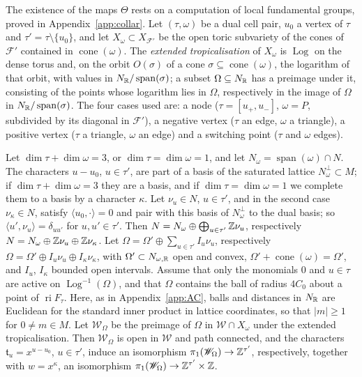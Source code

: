The existence of the maps $\Theta$ rests on a computation of local fundamental groups, proved in Appendix~\ref{app:collar}.
Let $(\tau,\omega)$ be a dual cell pair, $u_0$ a vertex of $\tau$ and $\tau'=\tau\setminus\{u_0\}$, and let
$X_\omega\subset X_{\mathcal F'}$ be the open toric subvariety of the cones of $\mathcal F'$ contained in
$\operatorname{cone}(\omega)$. The \emph{extended tropicalisation} of $X_\omega$ is $\operatorname{Log}$ on the dense torus and,
on the orbit $O(\sigma)$ of a cone $\sigma\subseteq\operatorname{cone}(\omega)$, the logarithm of that orbit, with values in
$N_\mathbb R/\operatorname{span}(\sigma)$; a subset $\Omega\subseteq N_\mathbb R$ has a preimage under it, consisting of the points whose
logarithm lies in $\Omega$, respectively in the image of $\Omega$ in $N_\mathbb R/\operatorname{span}(\sigma)$. The four cases used
are: a node ($\tau=[u_+,u_-]$, $\omega=P$, subdivided by its diagonal in $\mathcal F'$), a negative vertex ($\tau$ an edge,
$\omega$ a triangle), a positive vertex ($\tau$ a triangle, $\omega$ an edge) and a switching point ($\tau$ and $\omega$ edges).

\begin{lemma}\label{lem:pi1}
Let $\dim\tau+\dim\omega=3$, or $\dim\tau=\dim\omega=1$, and let $N_\omega=\operatorname{span}(\omega)\cap N$. The characters
$u-u_0$, $u\in\tau'$, are part of a basis of the saturated lattice $N_\omega^\perp\subset M$; if $\dim\tau+\dim\omega=3$ they
are a basis, and if $\dim\tau=\dim\omega=1$ we complete them to a basis by a character $\kappa$. Let $\nu_u\in N$, $u\in\tau'$,
and in the second case $\nu_\kappa\in N$, satisfy $\langle u_0,\cdot\rangle=0$ and pair with this basis of $N_\omega^\perp$ to
the dual basis; so $\langle u',\nu_u\rangle=\delta_{uu'}$ for $u,u'\in\tau'$. Then $N=N_\omega\oplus\bigoplus_{u\in\tau'}\mathbb Z\nu_u$,
respectively $N=N_\omega\oplus\mathbb Z\nu_u\oplus\mathbb Z\nu_\kappa$. Let $\Omega=\Omega'\oplus\sum_{u\in\tau'}I_u\nu_u$, respectively
$\Omega=\Omega'\oplus I_u\nu_u\oplus I_\kappa\nu_\kappa$, with $\Omega'\subset N_{\omega,\mathbb R}$ open and convex,
$\Omega'+\operatorname{cone}(\omega)=\Omega'$, and $I_u$, $I_\kappa$ bounded open intervals. Assume that only the monomials $0$
and $u\in\tau$ are active on $\operatorname{Log}^{-1}(\Omega)$, and that $\Omega$ contains the ball of radius $4C_0$ about a point
of $\operatorname{ri}F_\tau$. Here, as in Appendix~\ref{app:AC}, balls and distances in $N_\mathbb R$ are Euclidean for the standard
inner product in lattice coordinates, so that $|m|\ge1$ for $0\neq m\in M$. Let $\mathscr W_\Omega$ be the preimage of $\Omega$ in $\mathscr W\cap X_\omega$ under the extended tropicalisation.
Then $\mathscr W_\Omega$ is open in $\mathscr W$ and path connected, and the characters $\mathfrak t_u=x^{u-u_0}$, $u\in\tau'$, induce an
isomorphism $\pi_1(\mathscr W_\Omega)\to\mathbb Z^{\tau'}$, respectively, together with $w=x^\kappa$, an isomorphism
$\pi_1(\mathscr W_\Omega)\to\mathbb Z^{\tau'}\times\mathbb Z$.
\end{lemma}

